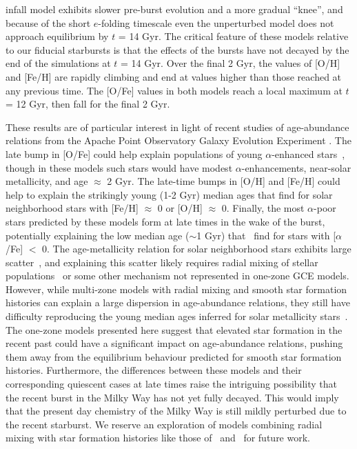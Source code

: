 infall model exhibits slower pre-burst evolution and a more gradual ``knee'', 
and because of the short $e$-folding timescale even the unperturbed model does 
not approach equilibrium by $t$ = 14 Gyr. The critical feature of these models 
relative to our fiducial starbursts is that the effects of the bursts have not 
decayed by the end of the simulations at $t$ = 14 Gyr. Over the final 2 Gyr, 
the values of [O/H] and [Fe/H] are rapidly climbing and end at values higher 
than those reached at any previous time. The [O/Fe] values in both models 
reach a local maximum at $t$ = 12 Gyr, then fall for the final 2 Gyr. 
\par
{\sloppy
These results are of particular interest in light of recent 
studies of age-abundance relations from the Apache Point Observatory Galaxy 
Evolution Experiment \linebreak \citep[APOGEE; e.g.,][]{Martig2016,
SilvaAguirre2018, Feuillet2018, Feuillet2019}.
}
The late bump in [O/Fe] could 
help explain populations of young $\alpha$-enhanced stars~\citep{Martig2016, 
Feuillet2019}, though in these models such stars would have modest 
$\alpha$-enhancements, 
near-solar metallicity, and age $\approx$ 2 Gyr. The late-time bumps in [O/H] 
and [Fe/H] could help to explain the strikingly young (1-2 Gyr) median ages that 
\citet{Feuillet2018} find for solar neighborhood stars with [Fe/H] $\approx$ 
0 or [O/H] $\approx$ 0. Finally, the most $\alpha$-poor stars predicted by 
these models form at late times in the wake of the burst, potentially 
explaining the low median age ($\sim$1 Gyr) that~\citet{Feuillet2018} find for 
stars with [$\alpha$/Fe] $<$ 0. The age-metallicity relation 
for solar neighborhood stars exhibits large scatter~\citep{Edvardsson1993}, 
and explaining this scatter likely requires radial mixing of stellar 
populations~\citep[e.g.][]{Schoenrich2009a} or some other mechanism not 
represented in one-zone GCE models. However, while multi-zone models with 
radial mixing and smooth star formation histories can explain a large 
dispersion in age-abundance relations, they still have difficulty reproducing 
the young median ages inferred for solar metallicity stars~\citep[][see 
their Fig. 15]{Feuillet2018}. 
The one-zone models presented here suggest that elevated star formation in the 
recent past could have a significant impact on age-abundance relations, 
pushing them away from the equilibrium behaviour predicted for smooth star 
formation histories. Furthermore, the differences between these models and 
their corresponding quiescent cases at late times raise the intriguing 
possibility that the recent burst in the Milky Way has not yet fully decayed. 
This would imply that the present day chemistry of the Milky Way is still 
mildly perturbed due to the recent starburst. We reserve an exploration of 
models combining radial mixing with star formation histories like those 
of~\citet{Mor2019} and~\citet{Isern2019} for future work.

